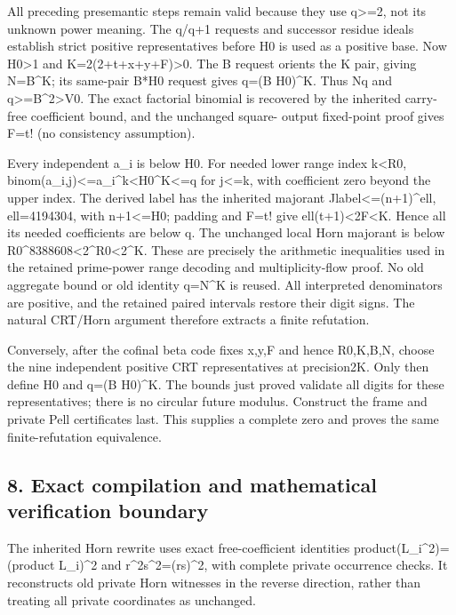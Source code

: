 All preceding presemantic steps remain valid because they use
q\textgreater=2, not its unknown power meaning. The q/q+1 requests and
successor residue ideals establish strict positive representatives
before H0 is used as a positive base. Now H0\textgreater1 and
K=2(2+t+x+y+F)\textgreater0. The B request orients the K pair, giving
N=B\^{}K; its same-pair B*H0 request gives q=(B H0)\^{}K. Thus
N\textbar q and q\textgreater=B\^{}2\textgreater V0. The exact factorial
binomial is recovered by the inherited carry-free coefficient bound, and
the unchanged square- output fixed-point proof gives F=t! (no
consistency assumption).

Every independent a\_i is below H0. For needed lower range index
k\textless R0,
binom(a\_i,j)\textless=a\_i\^{}k\textless H0\^{}K\textless=q for
j\textless=k, with coefficient zero beyond the upper index. The derived
label has the inherited majorant Jlabel\textless=(n+1)\^{}ell,
ell=4194304, with n+1\textless=H0; padding and F=t! give
ell(t+1)\textless2F\textless K. Hence all its needed coefficients are
below q. The unchanged local Horn majorant is below
R0\^{}8388608\textless2\^{}R0\textless2\^{}K. These are precisely the
arithmetic inequalities used in the retained prime-power range decoding
and multiplicity-flow proof. No old aggregate bound or old identity
q=N\^{}K is reused. All interpreted denominators are positive, and the
retained paired intervals restore their digit signs. The natural
CRT/Horn argument therefore extracts a finite refutation.

Conversely, after the cofinal beta code fixes x,y,F and hence R0,K,B,N,
choose the nine independent positive CRT representatives at precision2K.
Only then define H0 and q=(B H0)\^{}K. The bounds just proved validate
all digits for these representatives; there is no circular future
modulus. Construct the frame and private Pell certificates last. This
supplies a complete zero and proves the same finite-refutation
equivalence.

\subsection{8. Exact compilation and mathematical verification
boundary}\label{exact-compilation-and-mathematical-verification-boundary}

The inherited Horn rewrite uses exact free-coefficient identities
product(L\_i\^{}2)=(product L\_i)\^{}2 and r\^{}2s\^{}2=(rs)\^{}2, with
complete private occurrence checks. It reconstructs old private Horn
witnesses in the reverse direction, rather than treating all private
coordinates as unchanged.


